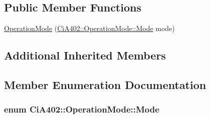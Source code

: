 \subsection*{Public Member Functions}
\begin{DoxyCompactItemize}
\item 
\hyperlink{struct_ci_a402_1_1_operation_mode_a7e379e59c52bbc8cd20957518e710a31}{Operation\-Mode} (\hyperlink{struct_ci_a402_1_1_operation_mode_a0f19a6a20de54376f05e373ae42d39ba}{Ci\-A402\-::\-Operation\-Mode\-::\-Mode} mode)
\end{DoxyCompactItemize}
\subsection*{Additional Inherited Members}


\subsection{Member Enumeration Documentation}
\hypertarget{struct_ci_a402_1_1_operation_mode_a0f19a6a20de54376f05e373ae42d39ba}{
\subsubsection[{Mode}]{\setlength{\rightskip}{0pt plus 5cm}enum {\bf Ci\-A402\-::\-Operation\-Mode\-::\-Mode}}}\label{struct_ci_a402_1_1_operation_mode_a0f19a6a20de54376f05e373ae42d39ba}
